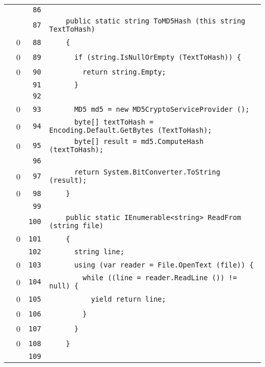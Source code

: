 \documentclass[a4paper,10pt]{article}
\begin{document}
\begin{longtable}[l]{lrrl}
\cellcolor{gray} &  & \verb~86~ & \verb~~\\
\cellcolor{gray} &  & \verb~87~ & \verb~    public static string ToMD5Hash (this string TextToHash)~\\
\cellcolor{red} & 0 & \verb~88~ & \verb~    {~\\
\cellcolor{red} & 0 & \verb~89~ & \verb~      if (string.IsNullOrEmpty (TextToHash)) {~\\
\cellcolor{red} & 0 & \verb~90~ & \verb~        return string.Empty;~\\
\cellcolor{gray} &  & \verb~91~ & \verb~      }~\\
\cellcolor{gray} &  & \verb~92~ & \verb~~\\
\cellcolor{red} & 0 & \verb~93~ & \verb~      MD5 md5 = new MD5CryptoServiceProvider ();~\\
\cellcolor{red} & 0 & \verb~94~ & \verb~      byte[] textToHash = Encoding.Default.GetBytes (TextToHash);~\\
\cellcolor{red} & 0 & \verb~95~ & \verb~      byte[] result = md5.ComputeHash (textToHash);~\\
\cellcolor{gray} &  & \verb~96~ & \verb~~\\
\cellcolor{red} & 0 & \verb~97~ & \verb~      return System.BitConverter.ToString (result);~\\
\cellcolor{red} & 0 & \verb~98~ & \verb~    }~\\
\cellcolor{gray} &  & \verb~99~ & \verb~~\\
\cellcolor{gray} &  & \verb~100~ & \verb~    public static IEnumerable<string> ReadFrom (string file)~\\
\cellcolor{red} & 0 & \verb~101~ & \verb~    {~\\
\cellcolor{gray} &  & \verb~102~ & \verb~      string line;~\\
\cellcolor{red} & 0 & \verb~103~ & \verb~      using (var reader = File.OpenText (file)) {~\\
\cellcolor{red} & 0 & \verb~104~ & \verb~        while ((line = reader.ReadLine ()) != null) {~\\
\cellcolor{red} & 0 & \verb~105~ & \verb~          yield return line;~\\
\cellcolor{red} & 0 & \verb~106~ & \verb~        }~\\
\cellcolor{red} & 0 & \verb~107~ & \verb~      }~\\
\cellcolor{red} & 0 & \verb~108~ & \verb~    }~\\
\cellcolor{gray} &  & \verb~109~ & \verb~~\\

\end{longtable}
\end{document}
